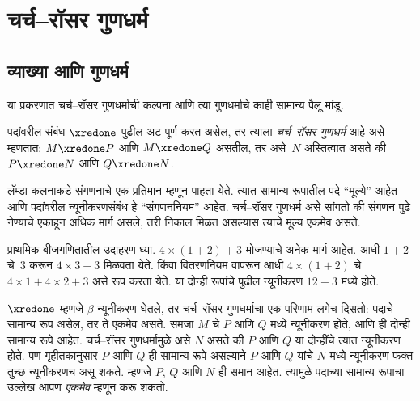 \chapter{चर्च–रॉसर गुणधर्म}\label{lam:cr:chap}









\section{व्याख्या आणि गुणधर्म}\label{lam:cr:dap:sec}

या प्रकरणात चर्च–रॉसर गुणधर्माची कल्पना आणि त्या
गुणधर्माचे काही सामान्य पैलू मांडू.

\begin{defn}[चर्च–रॉसर गुणधर्म, CR] पदांवरील संबंध $\xredone$
  पुढील अट पूर्ण करत असेल, तर त्याला \emph{चर्च–रॉसर गुणधर्म}
  आहे असे म्हणतात: $M \xredone P$ आणि $M \xredone Q$
  असतील, तर असे~$N$ अस्तित्वात असते की
  $P \xredone N$ आणि $Q \xredone N$.
\end{defn}

लॅम्डा कलनाकडे संगणनाचे एक प्रतिमान म्हणून पाहता येते.
त्यात सामान्य रूपातील पदे ``मूल्ये'' आहेत आणि पदांवरील
न्यूनीकरणसंबंध हे ``संगणननियम'' आहेत. चर्च–रॉसर गुणधर्म
असे सांगतो की संगणन पुढे नेण्याचे एकाहून अधिक मार्ग
असले, तरी निकाल मिळत असल्यास त्याचे मूल्य एकमेव असते.

प्राथमिक बीजगणितातील उदाहरण घ्या. $4 \times (1+2) + 3$
मोजण्याचे अनेक मार्ग आहेत. आधी $1+2$ चे~$3$ करून
$4
\times 3+3$ मिळवता येते. किंवा वितरणनियम वापरून
आधी $4 \times (1+2)$ चे $4 \times 1+4
\times 2+3$ असे रूप करता येते. या दोन्ही रूपांचे
पुढील न्यूनीकरण $12+3$ मध्ये होते.

$\xredone$ म्हणजे $\beta$-न्यूनीकरण घेतले, तर
चर्च–रॉसर गुणधर्माचा एक परिणाम लगेच दिसतो:
पदाचे सामान्य रूप असेल, तर ते एकमेव असते.
समजा $M$ चे $P$ आणि $Q$ मध्ये न्यूनीकरण होते,
आणि ही दोन्ही सामान्य रूपे आहेत. चर्च–रॉसर गुणधर्मामुळे
असे $N$ असते की $P$ आणि $Q$ या दोन्हींचे त्यात
न्यूनीकरण होते. पण गृहीतकानुसार $P$ आणि $Q$ ही
सामान्य रूपे असल्याने $P$ आणि $Q$ यांचे $N$ मध्ये
न्यूनीकरण फक्त तुच्छ न्यूनीकरणच असू शकते.
म्हणजे $P$, $Q$ आणि $N$ ही समान आहेत.
त्यामुळे पदाच्या सामान्य रूपाचा उल्लेख आपण
\emph{एकमेव} म्हणून करू शकतो.

